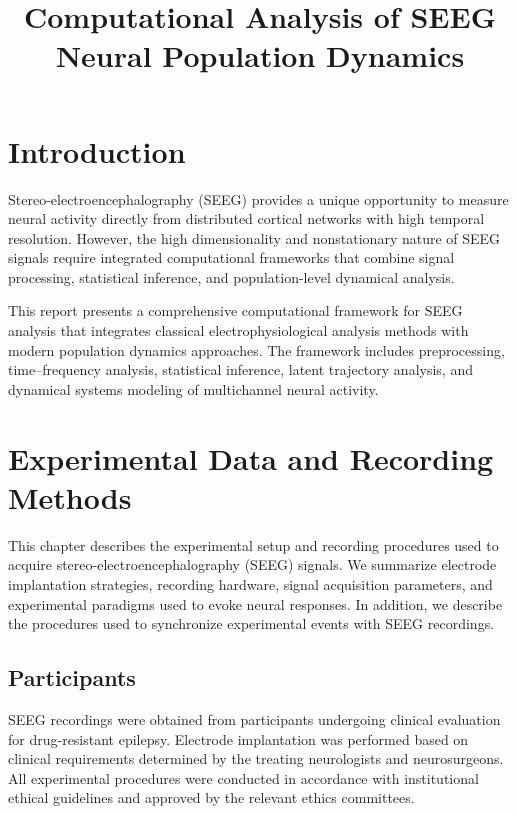 \documentclass[11pt]{report}
\title{Computational Analysis of SEEG Neural Population Dynamics}
\author{}
\date{}
\begin{document}
\maketitle

\tableofcontents

\chapter{Introduction}

Stereo-electroencephalography (SEEG) provides a unique opportunity to measure neural activity
directly from distributed cortical networks with high temporal resolution.
However, the high dimensionality and nonstationary nature of SEEG signals require
integrated computational frameworks that combine signal processing,
statistical inference, and population-level dynamical analysis.

This report presents a comprehensive computational framework for SEEG analysis
that integrates classical electrophysiological analysis methods with modern
population dynamics approaches. The framework includes preprocessing,
time--frequency analysis, statistical inference, latent trajectory analysis,
and dynamical systems modeling of multichannel neural activity.

\chapter{Experimental Data and Recording Methods}

This chapter describes the experimental setup and recording procedures
used to acquire stereo-electroencephalography (SEEG) signals.
We summarize electrode implantation strategies, recording hardware,
signal acquisition parameters, and experimental paradigms used to
evoke neural responses. In addition, we describe the procedures used
to synchronize experimental events with SEEG recordings.

\section{Participants}

SEEG recordings were obtained from participants undergoing clinical
evaluation for drug-resistant epilepsy. Electrode implantation was
performed based on clinical requirements determined by the treating
neurologists and neurosurgeons. All experimental procedures were
conducted in accordance with institutional ethical guidelines and
approved by the relevant ethics committees.
\end{document}
